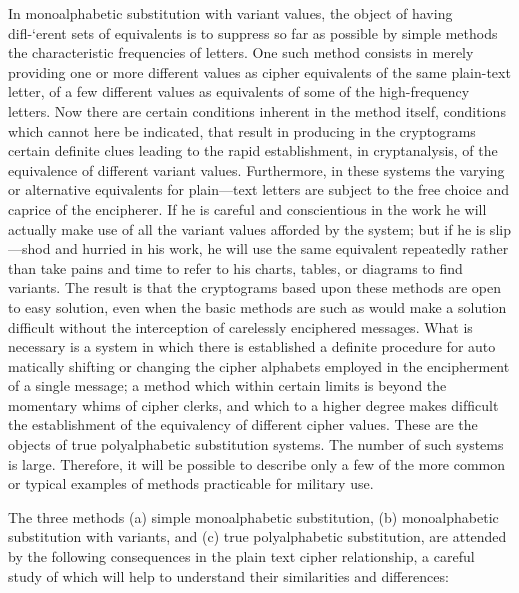 \mypara In monoalphabetic substitution with variant values, the object of
having diﬂ-‘erent sets of equivalents is to suppress so far as possible by
simple methods the characteristic frequencies of letters. One such method
consists in merely providing one or more different values as cipher
equivalents of the same plain-text letter, of a few different values as 
equivalents of some of the high-frequency letters. Now there are certain
conditions inherent in the method itself, conditions which cannot here be
indicated, that result in producing in the cryptograms certain deﬁnite
clues leading to the rapid establishment, in cryptanalysis, of the equivalence of different variant values. Furthermore, in these systems the varying or alternative equivalents for plain—text letters are subject to the free
choice and caprice of the encipherer. If he is careful and conscientious
in the work he will actually make use of all the variant values afforded
by the system; but if he is slip—shod and hurried in his work, he will use
the same equivalent repeatedly rather than take pains and time to refer
to his charts, tables, or diagrams to ﬁnd variants. The result is that the
cryptograms based upon these methods are open to easy solution, even
when the basic methods are such as would make a solution difficult without the interception of carelessly enciphered messages. What is necessary
is a system in which there is established a deﬁnite procedure for auto
matically shifting or changing the cipher alphabets employed in the encipherment of a single message; a method which within certain limits is
beyond the momentary whims of cipher clerks, and which to a higher
degree makes difﬁcult the establishment of the equivalency of different
cipher values. These are the objects of true polyalphabetic substitution
systems. The number of such systems is large. Therefore, it will be possible to describe only a few of the more common or typical examples of
methods practicable for military use.

\mypara The three methods (a) simple monoalphabetic substitution, (b)
monoalphabetic substitution with variants, and (c) true polyalphabetic
substitution, are attended by the following consequences in the plain text
cipher relationship, a careful study of which will help to understand their
similarities and differences:

